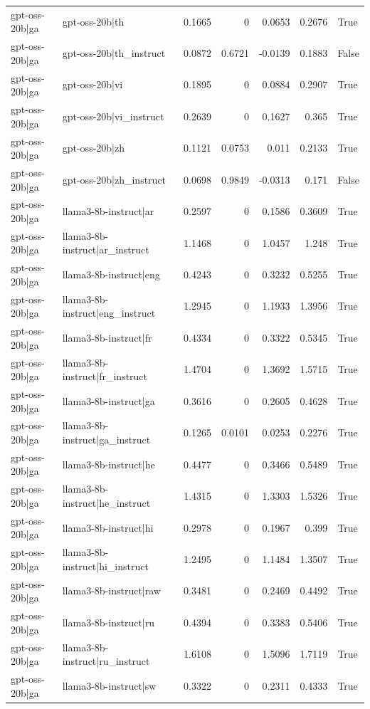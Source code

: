 \begin{table}
\begin{tabular}{l l r r r r l}
gpt-oss-20b|ga & gpt-oss-20b|th & 0.1665 & 0 & 0.0653 & 0.2676 & True \\
gpt-oss-20b|ga & gpt-oss-20b|th_instruct & 0.0872 & 0.6721 & -0.0139 & 0.1883 & False \\
gpt-oss-20b|ga & gpt-oss-20b|vi & 0.1895 & 0 & 0.0884 & 0.2907 & True \\
gpt-oss-20b|ga & gpt-oss-20b|vi_instruct & 0.2639 & 0 & 0.1627 & 0.365 & True \\
gpt-oss-20b|ga & gpt-oss-20b|zh & 0.1121 & 0.0753 & 0.011 & 0.2133 & True \\
gpt-oss-20b|ga & gpt-oss-20b|zh_instruct & 0.0698 & 0.9849 & -0.0313 & 0.171 & False \\
gpt-oss-20b|ga & llama3-8b-instruct|ar & 0.2597 & 0 & 0.1586 & 0.3609 & True \\
gpt-oss-20b|ga & llama3-8b-instruct|ar_instruct & 1.1468 & 0 & 1.0457 & 1.248 & True \\
gpt-oss-20b|ga & llama3-8b-instruct|eng & 0.4243 & 0 & 0.3232 & 0.5255 & True \\
gpt-oss-20b|ga & llama3-8b-instruct|eng_instruct & 1.2945 & 0 & 1.1933 & 1.3956 & True \\
gpt-oss-20b|ga & llama3-8b-instruct|fr & 0.4334 & 0 & 0.3322 & 0.5345 & True \\
gpt-oss-20b|ga & llama3-8b-instruct|fr_instruct & 1.4704 & 0 & 1.3692 & 1.5715 & True \\
gpt-oss-20b|ga & llama3-8b-instruct|ga & 0.3616 & 0 & 0.2605 & 0.4628 & True \\
gpt-oss-20b|ga & llama3-8b-instruct|ga_instruct & 0.1265 & 0.0101 & 0.0253 & 0.2276 & True \\
gpt-oss-20b|ga & llama3-8b-instruct|he & 0.4477 & 0 & 0.3466 & 0.5489 & True \\
gpt-oss-20b|ga & llama3-8b-instruct|he_instruct & 1.4315 & 0 & 1.3303 & 1.5326 & True \\
gpt-oss-20b|ga & llama3-8b-instruct|hi & 0.2978 & 0 & 0.1967 & 0.399 & True \\
gpt-oss-20b|ga & llama3-8b-instruct|hi_instruct & 1.2495 & 0 & 1.1484 & 1.3507 & True \\
gpt-oss-20b|ga & llama3-8b-instruct|raw & 0.3481 & 0 & 0.2469 & 0.4492 & True \\
gpt-oss-20b|ga & llama3-8b-instruct|ru & 0.4394 & 0 & 0.3383 & 0.5406 & True \\
gpt-oss-20b|ga & llama3-8b-instruct|ru_instruct & 1.6108 & 0 & 1.5096 & 1.7119 & True \\
gpt-oss-20b|ga & llama3-8b-instruct|sw & 0.3322 & 0 & 0.2311 & 0.4333 & True \\

\end{tabular}
\end{table}
